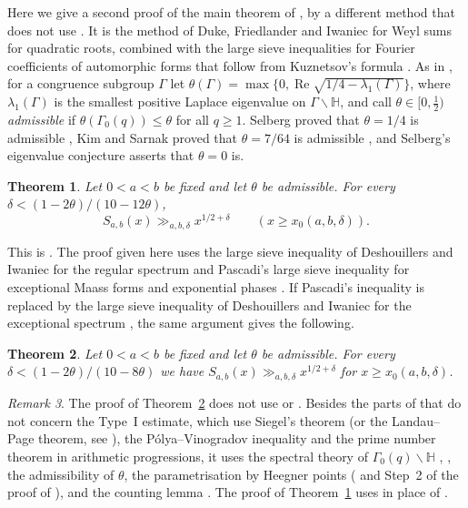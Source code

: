 \documentclass[11pt]{amsart}
\newtheorem{theorem}{Theorem}[section]
\theoremstyle{remark}
\newtheorem{remark}[theorem]{Remark}
\theoremstyle{definition}
\numberwithin{equation}{section}
\newcommand{\Hb}{\mathbb{H}}
\begin{document}
Here we give a second proof of the main theorem of \cite{II}, by a different method that does not use \cite{GM1,GM2}. It is the method of Duke, Friedlander and Iwaniec \cite{DFI95,DFI12} for Weyl sums for quadratic roots, combined with the large sieve inequalities for Fourier coefficients of automorphic forms that follow from Kuznetsov's formula \cite{Kuz}. As in \cite{II}, for a congruence subgroup $\Gamma$ let $\theta(\Gamma)=\max\{0,\operatorname{Re}\sqrt{1/4-\lambda_1(\Gamma)}\}$, where $\lambda_1(\Gamma)$ is the smallest positive Laplace eigenvalue on $\Gamma\backslash\Hb$, and call $\theta\in[0,\frac12)$ \emph{admissible} if $\theta(\Gamma_0(q))\le\theta$ for all $q\ge1$. Selberg proved that $\theta=1/4$ is admissible \cite{Sel}, Kim and Sarnak proved that $\theta=7/64$ is admissible \cite[Appendix~2]{Kim}, and Selberg's eigenvalue conjecture asserts that $\theta=0$ is.

\begin{theorem}\label{thm:main}
Let $0<a<b$ be fixed and let $\theta$ be admissible. For every $\delta<(1-2\theta)/(10-12\theta)$,
\[
S_{a,b}(x)\gg_{a,b,\delta}x^{1/2+\delta}\qquad(x\ge x_0(a,b,\delta)).
\]
\end{theorem}

This is \cite[Theorem~1.1]{II}. The proof given here uses the large sieve inequality of Deshouillers and Iwaniec for the regular spectrum \cite[Theorem~2]{DI} and Pascadi's large sieve inequality for exceptional Maass forms and exponential phases \cite[Theorem~2]{Pas}. If Pascadi's inequality is replaced by the large sieve inequality of Deshouillers and Iwaniec for the exceptional spectrum \cite[Theorem~5]{DI}, the same argument gives the following.

\begin{theorem}\label{thm:DI}
Let $0<a<b$ be fixed and let $\theta$ be admissible. For every $\delta<(1-2\theta)/(10-8\theta)$ we have $S_{a,b}(x)\gg_{a,b,\delta}x^{1/2+\delta}$ for $x\ge x_0(a,b,\delta)$.
\end{theorem}

\begin{remark}\label{rem:inputs}
The proof of Theorem~\ref{thm:DI} does not use \cite{GM1,GM2} or \cite{Pas}. Besides the parts of \cite{I,II} that do not concern the Type~I estimate, which use Siegel's theorem (or the Landau--Page theorem, see \cite[Remark~8.4]{II}), the P\'olya--Vinogradov inequality and the prime number theorem in arithmetic progressions, it uses the spectral theory of $\Gamma_0(q)\backslash\Hb$ \cite{Iw}, \cite[Theorems~2 and~5]{DI}, the admissibility of $\theta$, the parametrisation by Heegner points (\cite[Lemma~6.2]{II} and Step~2 of the proof of \cite[Proposition~6.5]{II}), and the counting lemma \cite[Lemma~6.4]{II}. The proof of Theorem~\ref{thm:main} uses \cite[Theorem~2]{Pas} in place of \cite[Theorem~5]{DI}.
\end{remark}
\end{document}
